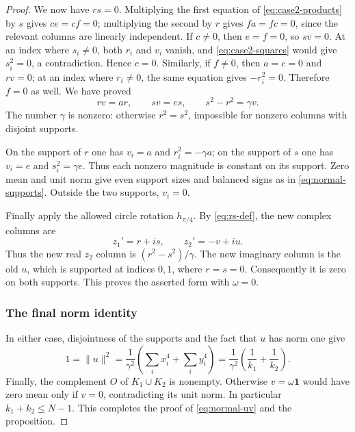 \documentclass[11pt,reqno]{amsart}
\theoremstyle{definition}
\theoremstyle{remark}
\numberwithin{equation}{section}
\newcommand{\one}{\mathbf 1}
\newcommand{\norm}[1]{\lVert #1\rVert}
\begin{document}
\begin{proof}
We now have $rs=0$. Multiplying the first equation of
\eqref{eq:case2-products} by $s$ gives $ce=cf=0$;
multiplying the second by $r$ gives $fa=fc=0$, since the relevant
columns are linearly independent. If $c\ne0$, then $e=f=0$, so
$sv=0$. At an index where $s_i\ne0$, both $r_i$ and $v_i$ vanish,
and \eqref{eq:case2-squares} would give $s_i^2=0$, a contradiction.
Hence $c=0$. Similarly, if $f\ne0$, then $a=c=0$ and $rv=0$;
at an index where $r_i\ne0$, the same equation gives
$-r_i^2=0$. Therefore $f=0$ as well. We have proved
\begin{equation}\label{eq:case2-reduced}
 rv=a r,\qquad sv=e s,\qquad s^2-r^2=\gamma v.
\end{equation}
The number $\gamma$ is nonzero: otherwise $r^2=s^2$, impossible
for nonzero columns with disjoint supports.

On the support of $r$ one has $v_i=a$ and $r_i^2=-\gamma a$;
on the support of $s$ one has $v_i=e$ and $s_i^2=\gamma e$.
Thus each nonzero magnitude is constant on its support. Zero mean
and unit norm give even support sizes and balanced signs as in
\eqref{eq:normal-supports}. Outside the two supports, $v_i=0$.

Finally apply the allowed circle rotation $h_{\pi/4}$. By
\eqref{eq:rs-def}, the new complex columns are
\[
 z_1'=r+is,\qquad z_2'=-v+iu.
\]
Thus the new real $z_2$ column is $(r^2-s^2)/\gamma$.
The new imaginary column is the old $u$, which is supported at
indices $0,1$, where $r=s=0$. Consequently it is zero on both
supports. This proves the asserted form with $\omega=0$.

\subsubsection*{The final norm identity}
In either case, disjointness of the supports and the fact that
$u$ has norm one give
\[
 1=\norm u^2
  =\frac1{\gamma^2}
     \left(\sum_i x_i^4+\sum_i y_i^4\right)
  =\frac1{\gamma^2}\left(\frac1{k_1}+\frac1{k_2}\right).
\]
Finally, the complement $O$ of $K_1\cup K_2$ is nonempty. Otherwise
$v=\omega\one$ would have zero mean only if $v=0$, contradicting its
unit norm. In particular $k_1+k_2\leq N-1$.
This completes the proof of \eqref{eq:normal-uv} and the proposition.
\end{proof}
\end{document}
